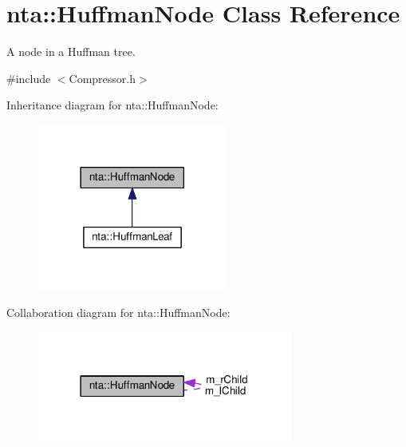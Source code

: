 \hypertarget{classnta_1_1HuffmanNode}{}\section{nta\+:\+:Huffman\+Node Class Reference}
\label{classnta_1_1HuffmanNode}


A node in a Huffman tree.  




{\ttfamily \#include $<$Compressor.\+h$>$}



Inheritance diagram for nta\+:\+:Huffman\+Node\+:\nopagebreak
\begin{figure}[H]
\begin{center}
\leavevmode
\includegraphics[width=177pt]{d4/d0d/classnta_1_1HuffmanNode__inherit__graph}
\end{center}
\end{figure}


Collaboration diagram for nta\+:\+:Huffman\+Node\+:\nopagebreak
\begin{figure}[H]
\begin{center}
\leavevmode
\includegraphics[width=238pt]{d5/d0a/classnta_1_1HuffmanNode__coll__graph}
\end{center}
\end{figure}
